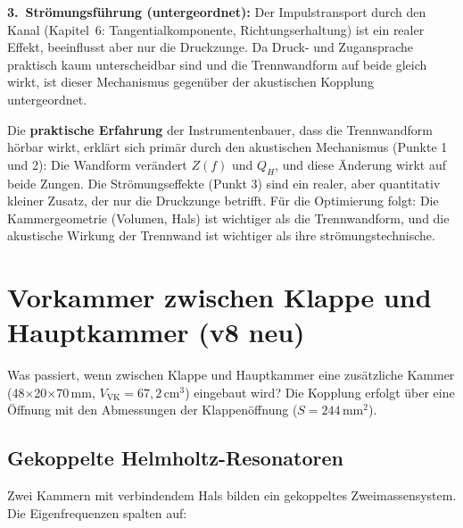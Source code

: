 \documentclass[11pt,a4paper]{article}
\begin{document}
\textbf{3.\ Strömungsführung (untergeordnet):} Der Impulstransport durch den Kanal (Kapitel~6: Tangentialkomponente, Richtungserhaltung) ist ein realer Effekt, beeinflusst aber nur die Druckzunge. Da Druck- und Zugansprache praktisch kaum unterscheidbar sind und die Trennwandform auf beide gleich wirkt, ist dieser Mechanismus gegenüber der akustischen Kopplung untergeordnet.

\begin{keybox}
Die \textbf{praktische Erfahrung} der Instrumentenbauer, dass die Trennwandform hörbar wirkt, erklärt sich primär durch den akustischen Mechanismus (Punkte 1 und 2): Die Wandform verändert $Z(f)$ und $Q_H$, und diese Änderung wirkt auf beide Zungen. Die Strömungseffekte (Punkt 3) sind ein realer, aber quantitativ kleiner Zusatz, der nur die Druckzunge betrifft. Für die Optimierung folgt: Die Kammergeometrie (Volumen, Hals) ist wichtiger als die Trennwandform, und die akustische Wirkung der Trennwand ist wichtiger als ihre strömungstechnische.
\end{keybox}

\section{Vorkammer zwischen Klappe und Hauptkammer (v8 neu)}

Was passiert, wenn zwischen Klappe und Hauptkammer eine zusätzliche Kammer (48$\times$20$\times$70\,mm, $V_\text{VK} = 67{,}2$\,cm$^3$) eingebaut wird? Die Kopplung erfolgt über eine Öffnung mit den Abmessungen der Klappenöffnung ($S = 244$\,mm$^2$).

\subsection{Gekoppelte Helmholtz-Resonatoren}

Zwei Kammern mit verbindendem Hals bilden ein gekoppeltes Zweimassensystem. Die Eigenfrequenzen spalten auf:

\begin{table}[H]
\centering\small
{}
\caption{Eigenfrequenzen ohne und mit Vorkammer}
\end{table}
\end{document}
